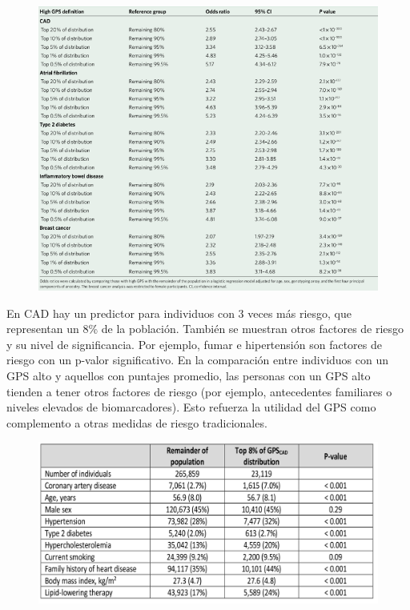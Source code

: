 \begin{figure}[htbp]
\centering
\includegraphics[width = 0.8 \textwidth]{figs/Imagen8.png}
\end{figure}

\newpage
En CAD hay un predictor para individuos con 3 veces más riesgo, que representan un 8\% de la población. También se muestran otros factores de riesgo y su nivel de significancia. Por ejemplo, fumar e hipertensión son factores de riesgo con un p-valor significativo. 
En la comparación entre individuos con un GPS alto y aquellos con puntajes promedio, las personas con un GPS alto tienden a tener otros factores de riesgo (por ejemplo, antecedentes familiares o niveles elevados de biomarcadores). Esto refuerza la utilidad del GPS como complemento a otras medidas de riesgo tradicionales.

\begin{figure}[htbp]
\centering
\includegraphics[width = 0.8 \textwidth]{figs/Imagen9.png}
\end{figure}

